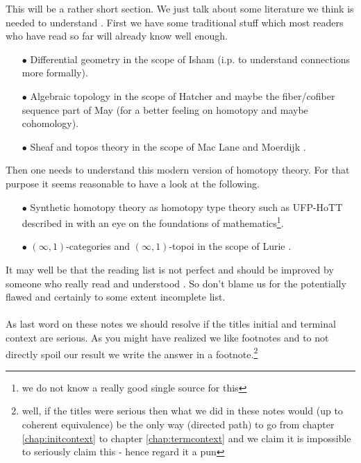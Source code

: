 This will be a rather short section. We just talk about some literature we think is needed to understand \cite{a565d200}. First we have some traditional stuff which most readers who have read so far will already know well enough.
\begin{enumerate}
\item[$\bullet$]
Differential geometry in the scope of Isham \cite{797789bc} (i.p. to understand connections more formally).
\item[$\bullet$]
Algebraic topology in the scope of Hatcher \cite{8b5861fc} and maybe the fiber/cofiber sequence part of May \cite{78202e13} (for a better feeling on homotopy and maybe cohomology).
\item[$\bullet$]
Sheaf and topos theory in the scope of Mac Lane and Moerdijk \cite{c55c71e8}.
\end{enumerate}
Then one needs to understand this modern version of homotopy theory. For that purpose it seems reasonable to have a look at the following.
\begin{enumerate}
\item[$\bullet$]
Synthetic homotopy theory as homotopy type theory such as UFP-HoTT described in \cite{1ba1603e} with an eye on the foundations of mathematics\footnote{we do not know a really good single source for this}.
\item[$\bullet$]
$(\infty,1)$-categories and $(\infty,1)$-topoi in the scope of Lurie \cite{0349e8ea}.
\end{enumerate}
It may well be that the reading list is  not perfect and should be improved by someone who really read and understood \cite{a565d200}. So don't blame us for the potentially flawed and certainly to some extent incomplete list.
\\\\
As last word on these notes we should resolve if the titles initial and terminal context are serious. As you might have realized we like footnotes and to not directly spoil our result we write the answer in a footnote.\footnote{well, if the titles were serious then what we did in these notes would (up to coherent equivalence) be the only way ({\glqq}directed path{\grqq}) to go from chapter \ref{chap:initcontext} to chapter \ref{chap:termcontext} and we claim it is impossible to seriously claim this - hence regard it a pun}
